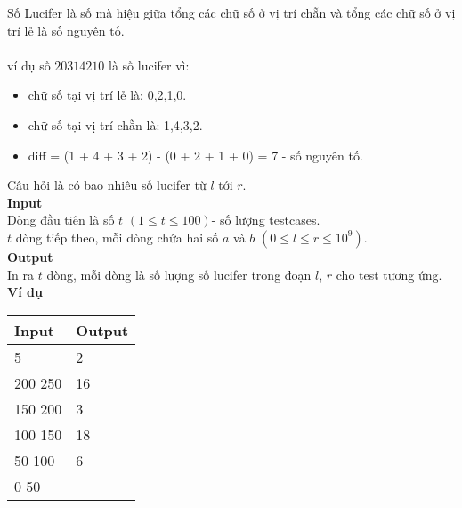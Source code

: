 Số Lucifer là số mà hiệu giữa tổng các chữ số ở vị trí chẵn và tổng các chữ số ở vị trí lẻ là số nguyên tố. 
\\
\\
ví dụ số $20314210$ là số lucifer vì:
\begin{itemize}
    \item chữ số tại vị trí lẻ là: 0,2,1,0. 
    \item chữ số tại vị trí chẵn là: 1,4,3,2.
    \item diff = (1 + 4 + 3 + 2) - (0 + 2 + 1 + 0) = 7 - số nguyên tố.
\end{itemize}
Câu hỏi là có bao nhiêu số lucifer từ $l$ tới $r$.
\\

\textbf{Input}
\\
Dòng đầu tiên là số $t$ $(1 \leq t \leq 100)$- số lượng testcases.
\\
$t$ dòng tiếp theo, mỗi dòng chứa hai số $a$ và $b$ $(0 \leq l \leq r \leq 10^{9})$.
\\

\textbf{Output}
\\
In ra $t$ dòng, mỗi dòng là số lượng số lucifer trong đoạn $l$, $r$ cho test tương ứng.
\\

\textbf{Ví dụ}
\begin{table}[h!]
    \begin{center}
        \begin{tabular}{|p{6cm}|p{6cm}|}
            \hline
            \textbf{Input} & \textbf{Output} \\ 
            \hline
            5 & 2 \\ 
            200 250 & 16 \\
            150 200 & 3 \\
            100 150 & 18 \\
            50 100 & 6 \\
            0 50 & \\
            \hline
        \end{tabular}
    \end{center}
\end{table}



